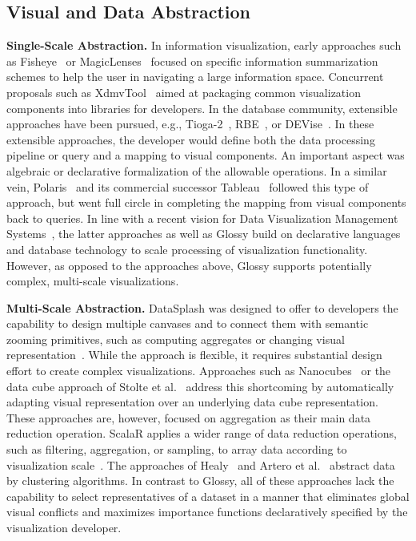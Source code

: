 \documentclass[11pt, oneside]{report}
\newcommand{\minisec}[1]{\noindent\textbf{#1.}}
\begin{document}
\subsection{Visual and Data Abstraction}
\label{sec:related:abstraction}

\minisec{Single-Scale Abstraction}
In information visualization, early approaches such as Fisheye~\cite{Sarkar:1994:Fisheye} or MagicLenses~\cite{BierSPBD93:MagicLenses} focused on specific information summarization schemes to help the user in navigating a large information space. Concurrent proposals such as XdmvTool~\cite{Ward:1994:XmdvTool} aimed at packaging common visualization components into libraries for developers. In the database community, extensible approaches have been pursued, e.g., Tioga-2~\cite{AikenCSW96:Tioga2}, RBE~\cite{KrishnamurthyZ95:RBE}, or DEVise~\cite{Livny:1997:DEVise}. In these extensible approaches, the developer would define both the data processing pipeline or query and a mapping to visual components. An important aspect was algebraic or declarative formalization of the allowable operations. In a similar vein, Polaris~\cite{StolteTH2008:Polaris} and its commercial successor Tableau~\cite{hanrahan:enthusiast} followed this type of approach, but went full circle in completing the mapping from visual components back to queries. In line with a recent vision for Data Visualization Management Systems~\cite{wu:case}, the latter approaches as well as Glossy build on declarative languages and database technology to scale processing of visualization functionality. However, as opposed to the approaches above, Glossy supports potentially complex, multi-scale visualizations.  

\minisec{Multi-Scale Abstraction}
DataSplash was designed to offer to developers the capability to design multiple canvases and to connect them with semantic zooming primitives, such as computing aggregates or changing visual representation~\cite{WoodruffOACELSS01:DataSplash}. While the approach is flexible, it requires substantial design effort to create complex visualizations. Approaches such as Nanocubes~\cite{LinsKS13:Nanocubes} or the data cube approach of Stolte et al.~\cite{StolteTH:2003:Multiscale} address this shortcoming by automatically adapting visual representation over an underlying data cube representation. These approaches are, however, focused on aggregation as their main data reduction operation. ScalaR applies a wider range of data reduction operations, such as filtering, aggregation, or sampling, to array data according to visualization scale~\cite{BattleSC13:DynamicReduction}. The approaches of Healy~\cite{Healey96:MultidimensionalViz} and Artero et al.~\cite{ArteroOL04:ClustersViz} abstract data by clustering algorithms. In contrast to Glossy, all of these approaches lack the capability to select representatives of a dataset in a manner that eliminates global visual conflicts and maximizes importance functions declaratively specified by the visualization developer.     
\end{document}
